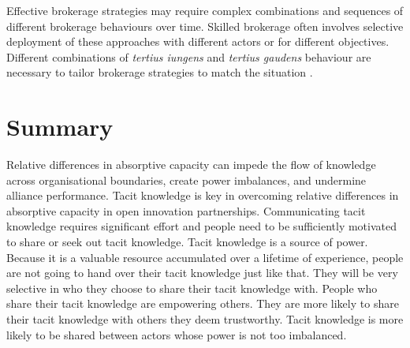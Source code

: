 Effective brokerage strategies may require complex combinations and sequences of different brokerage behaviours over time. Skilled brokerage often involves selective deployment of these approaches with different actors or for different objectives. Different combinations of \emph{tertius iungens} and \emph{tertius gaudens} behaviour are necessary to tailor brokerage strategies to match the situation \citep{obstfeld2014brokerage}. 




\section{Summary}

Relative differences in absorptive capacity can impede the flow of knowledge across organisational boundaries, create power imbalances, and undermine alliance performance. Tacit knowledge is key in overcoming relative differences in absorptive capacity in open innovation partnerships. Communicating tacit knowledge requires significant effort and people need to be sufficiently motivated to share or seek out tacit knowledge. Tacit knowledge is a source of power. Because it is a valuable resource accumulated over a lifetime of experience, people are not going to hand over their tacit knowledge just like that. They will be very selective in who they choose to share their tacit knowledge with. People who share their tacit knowledge are empowering others. They are more likely to share their tacit knowledge with others they deem trustworthy. Tacit knowledge is more likely to be shared between actors whose power is not too imbalanced.


